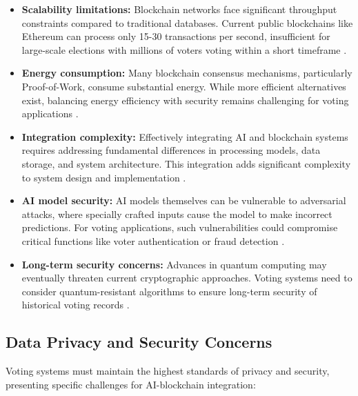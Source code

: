 \documentclass[conference]{IEEEtran}
\begin{document}
\begin{itemize}
    \item \textbf{Scalability limitations:} Blockchain networks face significant throughput constraints compared to traditional databases. Current public blockchains like Ethereum can process only 15-30 transactions per second, insufficient for large-scale elections with millions of voters voting within a short timeframe \cite{b7}.
    
    \item \textbf{Energy consumption:} Many blockchain consensus mechanisms, particularly Proof-of-Work, consume substantial energy. While more efficient alternatives exist, balancing energy efficiency with security remains challenging for voting applications \cite{b9}.
    
    \item \textbf{Integration complexity:} Effectively integrating AI and blockchain systems requires addressing fundamental differences in processing models, data storage, and system architecture. This integration adds significant complexity to system design and implementation \cite{b10}.
    
    \item \textbf{AI model security:} AI models themselves can be vulnerable to adversarial attacks, where specially crafted inputs cause the model to make incorrect predictions. For voting applications, such vulnerabilities could compromise critical functions like voter authentication or fraud detection \cite{b13}.
    
    \item \textbf{Long-term security concerns:} Advances in quantum computing may eventually threaten current cryptographic approaches. Voting systems need to consider quantum-resistant algorithms to ensure long-term security of historical voting records \cite{b16}.
\end{itemize}

\subsection{Data Privacy and Security Concerns}
Voting systems must maintain the highest standards of privacy and security, presenting specific challenges for AI-blockchain integration:
\end{document}
